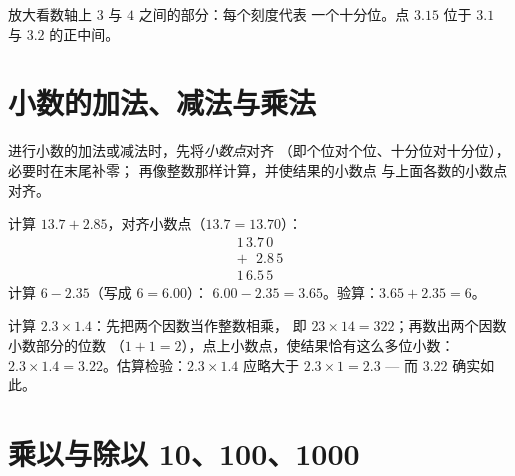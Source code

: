 \begin{omfigure}

{\small 放大看数轴上 $3$ 与 $4$ 之间的部分：每个刻度代表
一个十分位。点 $3.15$ 位于 $3.1$ 与 $3.2$ 的正中间。}
\end{omfigure}

\section{小数的加法、减法与乘法}

\begin{method}[小数的竖式计算]\label{met:g6:decimals:columns}
进行小数的加法或减法时，先将\emph{小数点}对齐
（即个位对个位、十分位对十分位），必要时在末尾补零；
再像整数那样计算，并使结果的小数点
与上面各数的小数点对齐。
\end{method}

\begin{example}\label{ex:g6:decimals:addsub}
计算 $13.7 + 2.85$，对齐小数点（$13.7 = 13.70$）：
\[
\begin{array}{r}
1\,3.7\,0 \\
+\ \ \,2.8\,5 \\
\hline
1\,6.5\,5
\end{array}
\]
计算 $6 - 2.35$（写成 $6 = 6.00$）：
$6.00 - 2.35 = 3.65$。验算：$3.65 + 2.35 = 6$。
\end{example}

\begin{example}[小数的乘法]\label{ex:g6:decimals:mult}
计算 $2.3 \times 1.4$：先把两个因数当作整数相乘，
即 $23 \times 14 = 322$；再数出两个因数小数部分的位数
（$1 + 1 = 2$），点上小数点，使结果恰有这么多位小数：
$2.3 \times 1.4 = 3.22$。估算检验：$2.3 \times 1.4$
应略大于 $2.3 \times 1 = 2.3$ --- 而 $3.22$ 确实如此。
\end{example}

\section{乘以与除以 10、100、1000}

